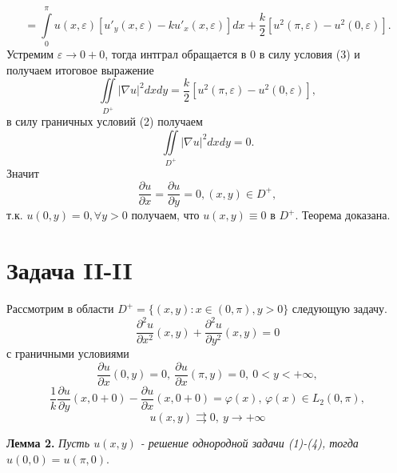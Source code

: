 \documentclass[12pt, a4paper]{article}
\begin{document}
	\begin{equation*}
		=  \int\limits_0^\pi u(x,\varepsilon) \left[ u'_y(x,\varepsilon) - k u'_x(x, \varepsilon) \right] dx + \dfrac{k}{2} \left[u^2(\pi, \varepsilon) - u^2(0, \varepsilon) \right].
	\end{equation*}
	Устремим $\varepsilon \to 0+0$, тогда интграл обращается в 0 в силу условия (3) и получаем итоговое выражение
	\begin{equation*}
		\iint\limits_{D^+}|\nabla u|^2 dx dy = \dfrac{k}{2} \left[u^2(\pi, \varepsilon) - u^2(0, \varepsilon) \right],
	\end{equation*}
	в силу граничных условий (2) получаем
	\begin{equation*}
		\iint\limits_{D^+}|\nabla u|^2 dx dy = 0.
	\end{equation*}
	Значит 
	\begin{equation*}
		\dfrac{\partial u}{\partial x} = \dfrac{\partial u}{\partial y} = 0, (x,y) \in D^+,
	\end{equation*}
	т.к. $u(0, y) = 0, \forall y > 0$ получаем, что $u(x,y) \equiv 0$ в $D^+$. Теорема доказана.
	
	
	\section{Задача II-II}
		Рассмотрим в области $D^+ = \{(x,y): x \in (0,\pi), y > 0\}$ следующую задачу.
	\begin{equation}
		\dfrac{\partial^2 u}{\partial x^2}(x,y) + \dfrac{\partial^2 u}{\partial y^2}(x,y) = 0
	\end{equation}
	с граничными условиями 
	\begin{equation}
		\dfrac{\partial u}{\partial x}(0,y) = 0, \ \dfrac{\partial u}{\partial x}(\pi, y) = 0, \ 0 < y < +\infty, 
	\end{equation}
	\begin{equation}
		\dfrac{1}{k} \dfrac{\partial u}{\partial y}(x,0+0) - \dfrac{\partial u}{\partial x}(x,0+0) = \varphi(x), \,\varphi(x) \in L_2(0,\pi),
	\end{equation}
	\begin{equation}
		u(x,y) \rightrightarrows 0, \ y \to +\infty 
	\end{equation}
	
		\textbf{Лемма 2.} \textit{Пусть $u(x,y)$ - решение однородной задачи (1)-(4), тогда $u(0,0) = u(\pi,0)$}.
	
\end{document}
